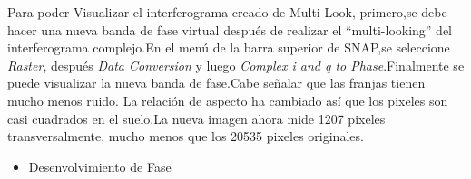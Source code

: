 \documentclass{article}
\begin{document}
    Para poder Visualizar el  interferograma creado de Multi-Look, primero,se debe hacer una nueva banda de fase virtual después de realizar el “multi-looking” del interferograma complejo.En el menú de la barra superior de SNAP,se seleccione \textit{Raster}, después \textit{Data Conversion} y luego \textit{Complex i and q to Phase}.Finalmente se puede visualizar la nueva banda de fase.Cabe señalar que las franjas tienen mucho menos ruido. La relación de aspecto ha cambiado así que los pixeles son casi cuadrados en el suelo.La nueva imagen ahora mide 1207 pixeles transversalmente, mucho menos que los 20535 pixeles originales.
\begin{itemize}
    \item Desenvolvimiento de Fase
\end{itemize}
\end{document}
